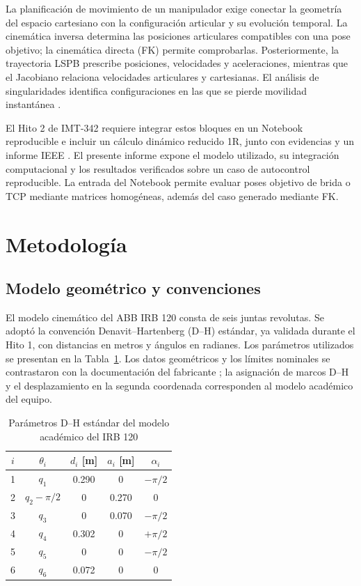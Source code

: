 \documentclass[conference]{IEEEtran}
\begin{document}
La planificación de movimiento de un manipulador exige conectar la geometría del espacio cartesiano con la configuración articular y su evolución temporal. La cinemática inversa determina las posiciones articulares compatibles con una pose objetivo; la cinemática directa (FK) permite comprobarlas. Posteriormente, la trayectoria LSPB prescribe posiciones, velocidades y aceleraciones, mientras que el Jacobiano relaciona velocidades articulares y cartesianas. El análisis de singularidades identifica configuraciones en las que se pierde movilidad instantánea \cite{siciliano}.

El Hito 2 de IMT-342 requiere integrar estos bloques en un Notebook reproducible e incluir un cálculo dinámico reducido 1R, junto con evidencias y un informe IEEE \cite{guiaH2,rubricaH2}. El presente informe expone el modelo utilizado, su integración computacional y los resultados verificados sobre un caso de autocontrol reproducible. La entrada del Notebook permite evaluar poses objetivo de brida o TCP mediante matrices homogéneas, además del caso generado mediante FK.

\section{Metodología}

\subsection{Modelo geométrico y convenciones}

El modelo cinemático del ABB IRB 120 consta de seis juntas revolutas. Se adoptó la convención Denavit--Hartenberg (D--H) estándar, ya validada durante el Hito 1, con distancias en metros y ángulos en radianes. Los parámetros utilizados se presentan en la Tabla~\ref{tab:dh}. Los datos geométricos y los límites nominales se contrastaron con la documentación del fabricante \cite{abbSpec,abbManual}; la asignación de marcos D--H y el desplazamiento en la segunda coordenada corresponden al modelo académico del equipo.

\begin{table}[!t]
\caption{Parámetros D--H estándar del modelo académico del IRB 120}
\label{tab:dh}
\centering
\footnotesize
\setlength{\tabcolsep}{4pt}
\begin{tabular}{ccccc}
\toprule
$i$ & $\theta_i$ & $d_i$ [m] & $a_i$ [m] & $\alpha_i$ \\
\midrule
1 & $q_1$ & 0.290 & 0 & $-\pi/2$ \\
2 & $q_2-\pi/2$ & 0 & 0.270 & $0$ \\
3 & $q_3$ & 0 & 0.070 & $-\pi/2$ \\
4 & $q_4$ & 0.302 & 0 & $+\pi/2$ \\
5 & $q_5$ & 0 & 0 & $-\pi/2$ \\
6 & $q_6$ & 0.072 & 0 & $0$ \\
\bottomrule
\end{tabular}
\end{table}
\end{document}
